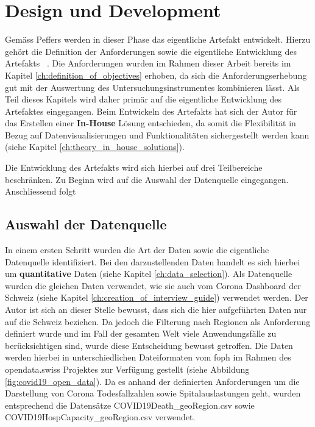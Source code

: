 \section{Design und Development}
Gemäss Peffers werden in dieser Phase das eigentliche Artefakt entwickelt. Hierzu gehört die Definition der Anforderungen sowie die eigentliche Entwicklung des Artefakts ~\citep[S. 55]{peffers}. Die Anforderungen wurden im Rahmen dieser Arbeit bereits im Kapitel \ref{ch:definition_of_objectives} erhoben, da sich die Anforderungserhebung gut mit der Auswertung des Untersuchungsinstrumentes kombinieren lässt. Als Teil dieses Kapitels wird daher primär auf die eigentliche Entwicklung des Artefaktes eingegangen. Beim Entwickeln des Artefakts hat sich der Autor für das Erstellen einer \textbf{In-House} Lösung entschieden, da somit die Flexibilität in Bezug auf Datenvisualisierungen und Funktionalitäten sichergestellt werden kann (siehe Kapitel \ref{ch:theory_in_house_solutions}).

Die Entwicklung des Artefakts wird sich hierbei auf drei Teilbereiche beschränken. Zu Beginn wird auf die Auswahl der Datenquelle eingegangen. Anschliessend folgt 

\subsection{Auswahl der Datenquelle}
In einem ersten Schritt wurden die Art der Daten sowie die eigentliche Datenquelle identifiziert. Bei den darzustellenden Daten handelt es sich hierbei um \textbf{quantitative} Daten (siehe Kapitel \ref{ch:data_selection}). Als Datenquelle wurden die gleichen Daten verwendet, wie sie auch vom Corona Dashboard der Schweiz (siehe Kapitel \ref{ch:creation_of_interview_guide}) verwendet werden. Der Autor ist sich an dieser Stelle bewusst, dass sich die hier aufgeführten Daten nur auf die Schweiz beziehen. Da jedoch die Filterung nach Regionen als Anforderung definiert wurde und im Fall der gesamten Welt viele Anwendungsfälle zu berücksichtigen sind, wurde diese Entscheidung bewusst getroffen. Die Daten werden hierbei in unterschiedlichen Dateiformaten vom \gls{foph} im Rahmen des opendata.swiss Projektes zur Verfügung gestellt (siehe Abbildung \ref{fig:covid19_open_data}). Da es anhand der definierten Anforderungen um die Darstellung von Corona Todesfallzahlen sowie Spitalauslastungen geht, wurden entsprechend die Datensätze COVID19Death\_geoRegion.csv sowie COVID19HospCapacity\_geoRegion.csv verwendet.

